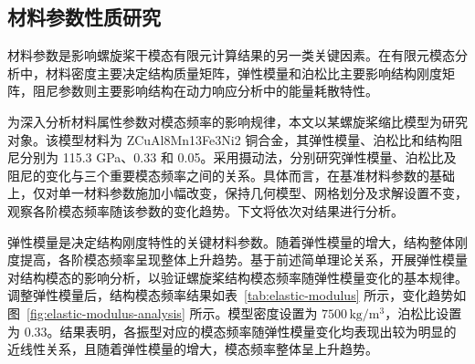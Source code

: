 \subsection{材料参数性质研究}

材料参数是影响螺旋桨干模态有限元计算结果的另一类关键因素。在有限元模态分析中，材料密度主要决定结构质量矩阵，弹性模量和泊松比主要影响结构刚度矩阵，阻尼参数则主要影响结构在动力响应分析中的能量耗散特性。

为深入分析材料属性参数对模态频率的影响规律，本文以某螺旋桨缩比模型为研究对象。该模型材料为 ZCuAl8Mn13Fe3Ni2 铜合金，其弹性模量、泊松比和结构阻尼分别为 115.3 GPa、0.33 和 0.05。采用摄动法，分别研究弹性模量、泊松比及阻尼的变化与三个重要模态频率之间的关系。具体而言，在基准材料参数的基础上，仅对单一材料参数施加小幅改变，保持几何模型、网格划分及求解设置不变，观察各阶模态频率随该参数的变化趋势。下文将依次对结果进行分析。

弹性模量是决定结构刚度特性的关键材料参数。随着弹性模量的增大，结构整体刚度提高，各阶模态频率呈现整体上升趋势。基于前述简单理论关系，开展弹性模量对结构模态的影响分析，以验证螺旋桨结构模态频率随弹性模量变化的基本规律。调整弹性模量后，结构模态频率结果如表~\ref{tab:elastic-modulus} 所示，变化趋势如图~\ref{fig:elastic-modulus-analysis} 所示。模型密度设置为 $7500\,\mathrm{kg/m^3}$，泊松比设置为 0.33。结果表明，各振型对应的模态频率随弹性模量变化均表现出较为明显的近线性关系，且随着弹性模量的增大，模态频率整体呈上升趋势。


